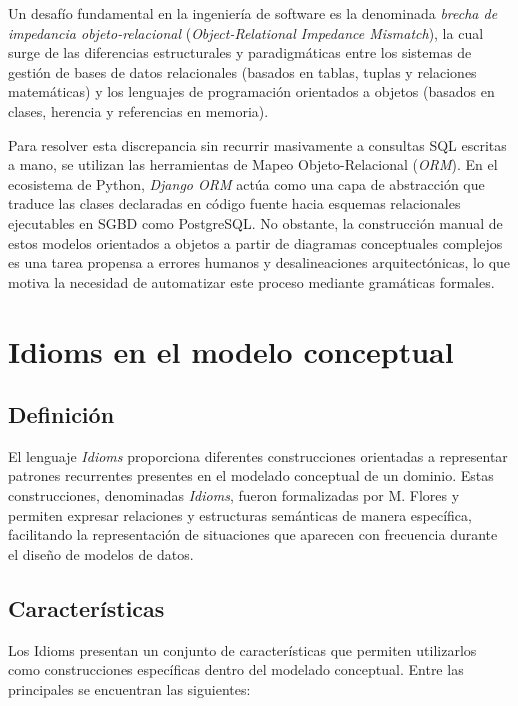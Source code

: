 Un desafío fundamental en la ingeniería de software es la denominada \textit{brecha de impedancia objeto-relacional} (\textit{Object-Relational Impedance Mismatch}), la cual surge de las diferencias estructurales y paradigmáticas entre los sistemas de gestión de bases de datos relacionales (basados en tablas, tuplas y relaciones matemáticas) y los lenguajes de programación orientados a objetos (basados en clases, herencia y referencias en memoria).

Para resolver esta discrepancia sin recurrir masivamente a consultas SQL escritas a mano, se utilizan las herramientas de Mapeo Objeto-Relacional (\textit{ORM}). En el ecosistema de Python, \textit{Django ORM} actúa como una capa de abstracción que traduce las clases declaradas en código fuente hacia esquemas relacionales ejecutables en SGBD como PostgreSQL. No obstante, la construcción manual de estos modelos orientados a objetos a partir de diagramas conceptuales complejos es una tarea propensa a errores humanos y desalineaciones arquitectónicas, lo que motiva la necesidad de automatizar este proceso mediante gramáticas formales.

\section{Idioms en el modelo conceptual}
\label{sec:idioms-modelo-conceptual}

\subsection{Definición}
\label{subsec:idioms-definicion}

El lenguaje \textit{Idioms} proporciona diferentes construcciones orientadas a representar patrones recurrentes presentes en el modelado conceptual de un dominio. Estas construcciones, denominadas \textit{Idioms}, fueron formalizadas por M. Flores \cite{flores2006idioms} y permiten expresar relaciones y estructuras semánticas de manera específica, facilitando la representación de situaciones que aparecen con frecuencia durante el diseño de modelos de datos.

\subsection{Características}
\label{subsec:idioms-caracteristicas}

Los Idioms presentan un conjunto de características que permiten utilizarlos como construcciones específicas dentro del modelado conceptual. Entre las principales se encuentran las siguientes:

